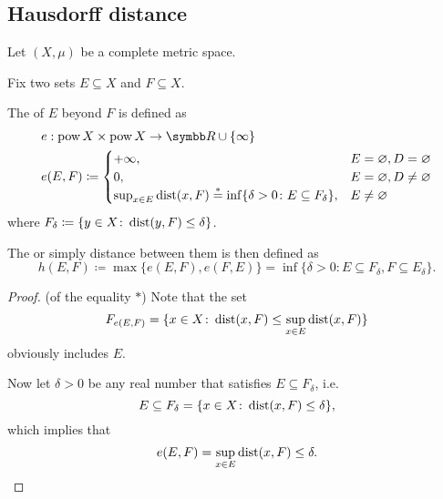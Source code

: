 \subsection{Hausdorff distance}\label{subsec:hausdorff_distance}

Let \( (X, \mu) \) be a complete metric space.

\begin{definition}\label{def:hausdorff_distance}\cite[144]{Dontchev2014}
  Fix two sets \( E \subseteq X \) and \( F \subseteq X \).

  The  of \( E \) beyond \( F \) is defined as
  \begin{align*}
    &e: \Pow X \times \Pow X \to \BR \cup \{ \infty \} \\
    &e(E, F) \coloneqq \begin{cases}
      +\infty, &E = \varnothing, D = \varnothing \\
      0, &E = \varnothing, D \neq \varnothing \\
      \sup_{x \in E} \Dist(x, F) \overset{*}{=} \inf \{\delta > 0 \colon E \subseteq F_\delta \}, &E \neq \varnothing \nonumber\refstepcounter{equation}
    \end{cases}
  \end{align*}
  where \( F_\delta \coloneqq \{ y \in X \colon \operatorname{dist}(y, F) \leq \delta \} \).

  The  or simply  distance between them is then defined as
  \begin{equation*}
    h(E, F) \coloneqq \max\{ e(E, F), e(F, E) \} = \inf \{\delta > 0 \colon E \subseteq F_\delta, F \subseteq E_\delta \}.
  \end{equation*}
\end{definition}
\begin{proof}(of the equality \( * \))
  Note that the set
  \begin{equation*}
    F_{e(E, F)} = \{ x \in X \colon \operatorname{dist}(x, F) \leq \sup_{x \in E} \operatorname{dist}(x, F) \}
  \end{equation*}
  obviously includes \( E \).

  Now let \( \delta > 0 \) be any real number that satisfies \( E \subseteq F_\delta \), i.e.
  \begin{equation*}
    E \subseteq F_\delta = \{ x \in X \colon \operatorname{dist}(x, F) \leq \delta \},
  \end{equation*}
  which implies that
  \begin{equation*}
    e(E, F) = \sup_{x \in E} \operatorname{dist}(x, F) \leq \delta.
  \end{equation*}
\end{proof}

